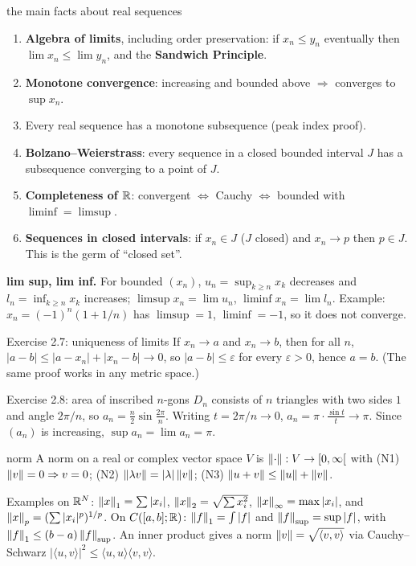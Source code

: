 \begin{thm}{the main facts about real sequences}
\begin{enumerate}
\item \textbf{Algebra of limits}, including order preservation: if $x_n\le y_n$ eventually then
  $\lim x_n\le\lim y_n$, and the \textbf{Sandwich Principle}.
\item \textbf{Monotone convergence}: increasing and bounded above $\Rightarrow$ converges to
  $\sup x_n$.
\item Every real sequence has a monotone subsequence (peak index proof).
\item \textbf{Bolzano--Weierstrass}: every sequence in a closed bounded interval $J$ has a
  subsequence converging to a point of $J$.
\item \textbf{Completeness of $\mathbb R$}: convergent $\iff$ Cauchy $\iff$ bounded with
  $\liminf=\limsup$.
\item \textbf{Sequences in closed intervals}: if $x_n\in J$ ($J$ closed) and $x_n\to p$ then
  $p\in J$. This is the germ of ``closed set''.
\end{enumerate}
\end{thm}

\textbf{lim sup, lim inf.} For bounded $(x_n)$, $u_n=\sup_{k\ge n}x_k$ decreases and
$l_n=\inf_{k\ge n}x_k$ increases; $\limsup x_n=\lim u_n$, $\liminf x_n=\lim l_n$. Example:
$x_n=(-1)^n(1+1/n)$ has $\limsup=1$, $\liminf=-1$, so it does not converge.

\begin{example}{Exercise 2.7: uniqueness of limits}
If $x_n\to a$ and $x_n\to b$, then for all $n$, $|a-b|\le|a-x_n|+|x_n-b|\to0$, so $|a-b|\le
\varepsilon$ for every $\varepsilon>0$, hence $a=b$. (The same proof works in any metric space.)
\end{example}

\begin{example}{Exercise 2.8: area of inscribed $n$-gons}
$D_n$ consists of $n$ triangles with two sides $1$ and angle $2\pi/n$, so
$a_n=\frac n2\sin\frac{2\pi}n$. Writing $t=2\pi/n\to0$, $a_n=\pi\cdot\frac{\sin t}{t}\to\pi$.
Since $(a_n)$ is increasing, $\sup a_n=\lim a_n=\pi$.
\end{example}

\begin{defn}{norm}
A norm on a real or complex vector space $V$ is $\left\lVert\cdot\right\rVert:V\to[0,\infty[$ with
(N1) $\left\lVert v\right\rVert=0\Rightarrow v=0$; (N2) $\left\lVert\lambda v\right\rVert=|\lambda|\left\lVert v\right\rVert$;
(N3) $\left\lVert u+v\right\rVert\le\left\lVert u\right\rVert+\left\lVert v\right\rVert$.
\end{defn}
Examples on $\mathbb R^N$: $\left\lVert x\right\rVert_1=\sum|x_i|$, $\left\lVert x\right\rVert_2=\sqrt{\sum x_i^2}$,
$\left\lVert x\right\rVert_\infty=\max|x_i|$, and $\left\lVert x\right\rVert_p=(\sum|x_i|^p)^{1/p}$. On $C([a,b];\mathbb R)$:
$\left\lVert f\right\rVert_1=\int|f|$ and $\left\lVert f\right\rVert_{\sup}=\sup|f|$, with $\left\lVert f\right\rVert_1\le(b-a)\left\lVert f\right\rVert_{\sup}$.
An inner product gives a norm $\left\lVert v\right\rVert=\sqrt{\langle v,v\rangle}$ via Cauchy--Schwarz
$|\langle u,v\rangle|^2\le\langle u,u\rangle\langle v,v\rangle$.

